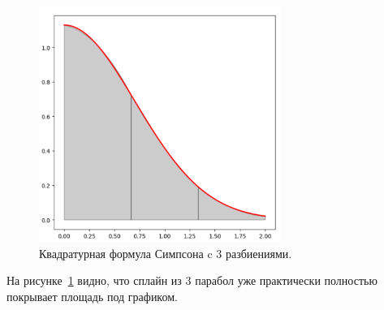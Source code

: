 \documentclass[a4paper, 14pt]{extarticle}
\begin{document}
    \begin{figure}[H]
        \centering
        \includegraphics[width=0.7\textwidth]{img/simpson}
        \caption{Квадратурная формула Симпсона c 3 разбиениями.}
        \label{fig:Simpson}
    \end{figure}

    На рисунке~\ref{fig:Simpson} видно, что сплайн из 3 парабол уже практически полностью
    покрывает площадь под графиком.
\end{document}
